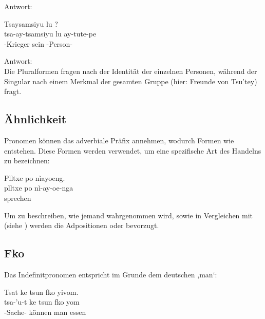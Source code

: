 \noindent Antwort:  

\begin{interlin}
	\glll \Npawl{}Tsaysamsiyu lu ? \\
	tsa-ay-tsamsiyu lu ay-tute-pe \\
	-Krieger sein -Person- \\
\end{interlin}

\noindent Antwort:   \\

\noindent Die Pluralformen fragen nach der Identität der einzelnen Personen, während der Singular nach einem Merkmal der gesamten Gruppe (hier: Freunde von Tsu'tey) fragt.

\subsection{Ähnlichkeit} Pronomen können das adverbiale Präfix  annehmen, wodurch Formen wie   entstehen. Diese Formen werden verwendet, um eine spezifische Art des Handelns zu bezeichnen: 

\begin{interlin}
	\glll \Npawl{}Plltxe po nìayoeng. \\
	plltxe po nì-ay-oe-nga \\
	sprechen   \\
\end{interlin}

\noindent Um zu beschreiben, wie jemand wahrgenommen wird, sowie in Vergleichen mit  (siehe ) werden die Adpositionen  oder  bevorzugt.

\subsection{Fko} Das Indefinitpronomen  entspricht im Grunde dem deutschen ,man‘:

\begin{interlin}
	\glll \Npawl{}Tsat ke tsun fko yivom. \\
	tsa-'u-t ke tsun fko yom \\
	-Sache-  können man essen \\
\end{interlin}

